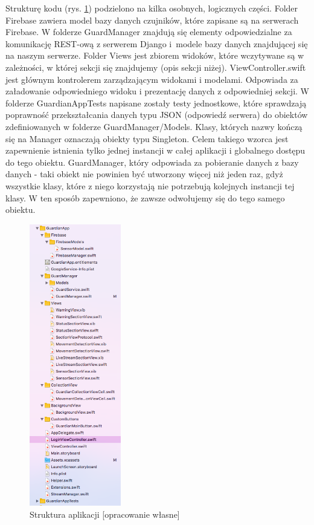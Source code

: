 \documentclass[polish,bachelor,a4paper,oneside]{ppfcmthesis}
\begin{document}
    Strukturę kodu (rys. \ref{iosversion}) podzielono na kilka osobnych, logicznych części. Folder Firebase zawiera model bazy danych czujników, które zapisane są na serwerach Firebase. W folderze GuardManager znajdują się elementy odpowiedzialne za komunikację REST-ową z serwerem Django i~modele bazy danych znajdującej się na naszym serwerze. Folder Views jest zbiorem widoków, które wczytywane są w zależności, w której sekcji się znajdujemy (opis sekcji niżej). ViewController.swift jest głównym kontrolerem zarządzającym widokami i modelami. Odpowiada za załadowanie odpowiedniego widoku i prezentację danych z odpowiedniej sekcji. W folderze GuardianAppTests napisane zostały testy jednostkowe, które sprawdzają poprawność przekształcania danych typu JSON (odpowiedź serwera) do obiektów zdefiniowanych w folderze GuardManager/Models. Klasy, których nazwy kończą się na Manager oznaczają obiekty typu Singleton. Celem takiego wzorca jest zapewnienie istnienia tylko jednej instancji w całej aplikacji i globalnego dostępu do tego obiektu. GuardManager, który odpowiada za pobieranie danych z bazy danych - taki obiekt nie powinien być utworzony więcej niż jeden raz, gdyż wszystkie klasy, które z niego korzystają nie potrzebują kolejnych instancji tej klasy. W ten sposób zapewniono, że zawsze odwołujemy się do tego samego obiektu.
    \begin{figure}[H]
        \centering
        \includegraphics[width=4cm]{ios_screenshots/iOSstructure.png}
        \caption{Struktura aplikacji [opracowanie własne]}
        \label{iosversion}
    \end{figure}
\end{document}
